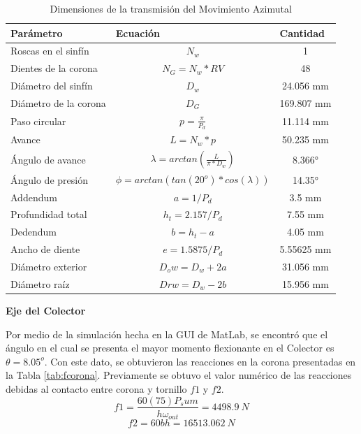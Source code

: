 \begin{table}[H]
	\centering
	\caption{Dimensiones de la transmisión del Movimiento Azimutal}
	\begin{tabular}{|l|c|c|}
		\hline
		\textbf{Parámetro} & \multicolumn{1}{l|}{\textbf{Ecuación}} & \multicolumn{1}{l|}{\textbf{Cantidad}} \\
		\hline \hline
		Roscas en el sinfín & $ N_w $ & 1 \\
		\hline
		Dientes de la corona & $ N_G = N_w * RV $ & 48 \\
		\hline
		Diámetro del sinfín & $ D_w $ & 24.056 mm \\
		\hline
		Diámetro de la corona & $ D_G $ & 169.807 mm \\
		\hline
		Paso circular & $ p = \frac{\pi}{P_d} $ & 11.114 mm \\
		\hline
		Avance & $ L = N_w * p $ & 50.235 mm \\
		\hline
		Ángulo de avance & $\lambda = arctan( \frac{L}{\pi * D_w} ) $ & 8.366° \\
		\hline
		Ángulo de presión & $ \phi = arctan(tan(20^{o})*cos(\lambda)) $ & 14.35° \\
		\hline
		Addendum & $ a = 1/P_d $ & 3.5 mm \\
		\hline
		Profundidad total & $ h_t = 2.157/P_d $ & 7.55 mm \\
		\hline
		Dedendum & $ b = h_t - a $ & 4.05 mm \\
		\hline
		Ancho de diente & $ e = 1.5875/P_d $ & 5.55625 mm \\
		\hline
		Diámetro exterior & $ D_ow = D_w + 2a $ & 31.056 mm \\
		\hline
		Diámetro raíz & $ Drw = D_w - 2b $ & 15.956 mm \\
		\hline
	\end{tabular}%
	\label{tab:transA}%
\end{table}%

\textbf{Eje del Colector}

Por medio de la simulación hecha en la GUI de MatLab, se encontró que el ángulo en el cual se presenta el mayor momento flexionante en el Colector es $ \theta=8.05^o $. Con este dato, se obtuvieron las reacciones en la corona presentadas en la Tabla \ref{tab:fcorona}. Previamente se obtuvo el valor numérico de las reacciones debidas al contacto entre corona y tornillo $ f1 $ y $ f2 $.
\begin{equation}
	f1=\frac{60(75)P_sum}{h \omega_{out}} =4498.9\ N
\end{equation}
\begin{equation}
	f2=60bh=16513.062\ N
\end{equation}

